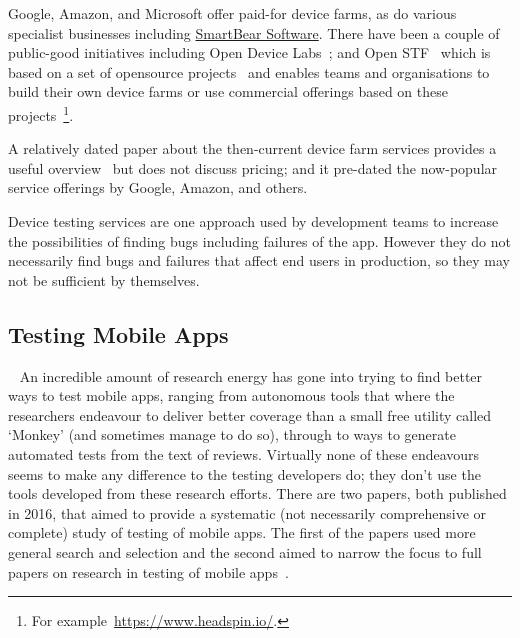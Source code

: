 Google, Amazon, and Microsoft offer paid-for device farms, as do various specialist businesses including \href{https://support.smartbear.com/bitbar/docs/about-bitbar.html}{SmartBear Software}. There have been a couple of public-good initiatives including Open Device Labs~; and Open STF~ which is based on a set of opensource projects~ and enables teams and organisations to build their own device farms or use commercial offerings based on these projects~\footnote{For example~\url{https://www.headspin.io/}.}.

A relatively dated paper about the then-current device farm services provides a useful overview~ but does not discuss pricing; and it pre-dated the now-popular service offerings by Google, Amazon, and others. 

Device testing services are one approach used by development teams to increase the possibilities of finding bugs including failures of the app. However they do not necessarily find bugs and failures that affect end users in production, so they may not be sufficient by themselves.


\subsection{Testing Mobile Apps}~\label{rw-testing-mobile-apps-topic}
An incredible amount of research energy has gone into trying to find better ways to test mobile apps, ranging from autonomous tools that where the researchers endeavour to deliver better coverage than a small free utility called `Monkey' (and sometimes manage to do so), through to ways to generate automated tests from the text of reviews. Virtually none of these endeavours seems to make any difference to the testing developers do; they don't use the tools developed from these research efforts. There are two papers, both published in 2016, that aimed to provide a systematic (not necessarily comprehensive or complete) study of testing of mobile apps. The first of the papers used more general search and selection   and the second aimed to narrow the focus to full papers on research in testing of mobile apps~. 


